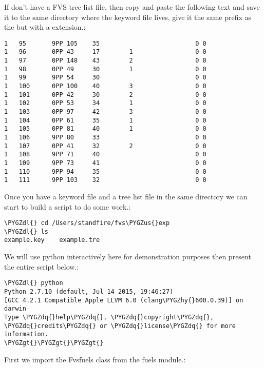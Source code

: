 \documentclass[letterpaper,10pt,english]{sphinxmanual}
\def\PYGZus{\char`\_}
\def\PYGZgt{\char`\>}
\def\PYGZdl{\char`\$}
\def\PYGZhy{\char`\-}
\def\PYGZdq{\char`\"}
\begin{document}
If don't have a FVS tree list file, then copy and paste the following text and save  it to the same directory where the keyword file lives, give it the same prefix as the  but with a  extension.:

\begin{Verbatim}[commandchars=\\\{\}]
1   95       9PP 105    35                          0 0
1   96       0PP 43     17        1                 0 0
1   97       0PP 148    43        2                 0 0
1   98       0PP 49     30        1                 0 0
1   99       9PP 54     30                          0 0
1   100      0PP 100    40        3                 0 0
1   101      0PP 42     30        2                 0 0
1   102      0PP 53     34        1                 0 0
1   103      0PP 97     42        3                 0 0
1   104      0PP 61     35        1                 0 0
1   105      0PP 81     40        1                 0 0
1   106      9PP 80     33                          0 0
1   107      0PP 41     32        2                 0 0
1   108      9PP 71     40                          0 0
1   109      9PP 73     41                          0 0
1   110      9PP 94     35                          0 0
1   111      9PP 103    32                          0 0
\end{Verbatim}

Once you have a keyword file and a tree list file in the same directory we can start to build a script to do some work.:

\begin{Verbatim}[commandchars=\\\{\}]
\PYGZdl{} cd /Users/standfire/fvs\PYGZus{}exp
\PYGZdl{} ls
example.key    example.tre
\end{Verbatim}

We will use python interactively here for demonstration purposes then present the entire script below.:

\begin{Verbatim}[commandchars=\\\{\}]
\PYGZdl{} python
Python 2.7.10 (default, Jul 14 2015, 19:46:27)
[GCC 4.2.1 Compatible Apple LLVM 6.0 (clang\PYGZhy{}600.0.39)] on darwin
Type \PYGZdq{}help\PYGZdq{}, \PYGZdq{}copyright\PYGZdq{}, \PYGZdq{}credits\PYGZdq{} or \PYGZdq{}license\PYGZdq{} for more information.
\PYGZgt{}\PYGZgt{}\PYGZgt{}
\end{Verbatim}

First we import the Fvsfuels class from the fuels module.:
\end{document}
